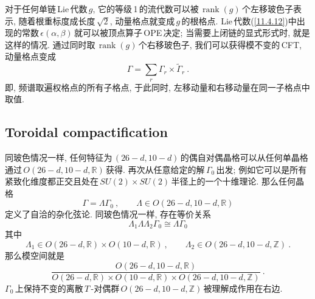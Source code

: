对于任何单链\,Lie\,代数$\,g$, 它的等级\,1\,的流代数可以被$\,\operatorname{rank}(g)\,$个左移玻色子表示, 随着根重标度成长度$\,\sqrt{2}$, 动量格点就变成$\,g\,$的根格点. Lie\,代数(\ref{11.4.12})中出现的常数$\,\epsilon(\alpha,\beta)\,$就可以被顶点算子\,OPE\,决定; 当需要上闭链的显式形式时, 就是这样的情况. 通过同时取\,$\operatorname{rank}(g)\,$个右移玻色子, 我们可以获得模不变的\,CFT, 动量格点变成
\begin{equation}
    \Gamma=\sum_{r}\Gamma_{r}\times \tilde{\Gamma}_{r} \:. \label{11.6.10}
\end{equation}
即, 频谱取遍权格点的所有子格点, 于此同时, 左移动量和右移动量在同一子格点中取值.

\subsection*{Toroidal compactification}

同玻色情况一样, 任何特征为$\,(26-d,10-d)\,$的偶自对偶晶格可以从任何单晶格通过$\,O(26-d,10-d,\mathds{R})\,$获得. 再次从任意给定的解$\,\Gamma_{0}\,$出发; 例如它可以是所有紧致化维度都正交且处在$\,SU(2)\times SU(2)\,$半径上的一个十维理论. 那么任何晶格
\begin{equation}
    \Gamma=\Lambda\Gamma_{0} \:,\qquad \Lambda\in O(26-d,10-d,\mathds{R}) \label{11.6.11}
\end{equation}
定义了自洽的杂化弦论. 同玻色情况一样, 存在等价关系
\begin{equation}
    \Lambda_{1}\Lambda\Lambda_{2}\Gamma_{0} \cong \Lambda\Gamma_{0} \label{11.6.12}
\end{equation}
其中
\begin{equation}
    \Lambda_{1} \in O(26-d,\mathds{R})\times O(10-d,\mathds{R}) \:,\qquad
    \Lambda_{2} \in O(26-d,10-d,\mathds{Z}) \:. \label{11.6.13}
\end{equation}
那么模空间就是
\begin{equation}
    \frac{ O(26-d,10-d,\mathds{R})}{ O(26-d,\mathds{R})\times O(10-d,\mathds{R})\times  O(26-d,10-d,\mathds{Z})}\:.
    \label{11.6.14}
\end{equation}
$\Gamma_{0}\,$上保持不变的离散\,$T$\,-对偶群$\,O(26-d,10-d,\mathds{Z})\,$被理解成作用在右边.

